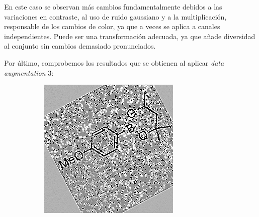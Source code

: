 En este caso se observan más cambios fundamentalmente debidos a las variaciones en contraste, al uso de ruido gaussiano y a la multiplicación, responsable de los cambios de color, ya que a veces se aplica a canales independientes. Puede ser una transformación adecuada, ya que añade diversidad al conjunto sin cambios demasiado pronunciados. 

Por último, comprobemos los resultados que se obtienen al aplicar \textit{data augmentation} 3:

\begin{figure}[H]
\centering
    \begin{subfigure}{.23\textwidth}
        \centering
        \includegraphics[width=1\linewidth]{imagenes/aug3/175.jpg}
    \end{subfigure}%
    \begin{subfigure}{.23\textwidth}
        \centering

\end{subfigure}
\end{figure}

